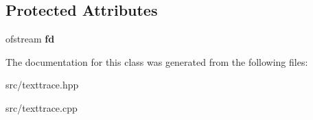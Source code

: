 \subsection*{Protected Attributes}
\begin{DoxyCompactItemize}
\item 
ofstream {\bfseries fd}\hypertarget{classRTSim_1_1TextTrace_aac40df3d96e1f7cb10ce8e88a477d37f}{}\label{classRTSim_1_1TextTrace_aac40df3d96e1f7cb10ce8e88a477d37f}

\end{DoxyCompactItemize}


The documentation for this class was generated from the following files\+:\begin{DoxyCompactItemize}
\item 
src/texttrace.\+hpp\item 
src/texttrace.\+cpp\end{DoxyCompactItemize}
